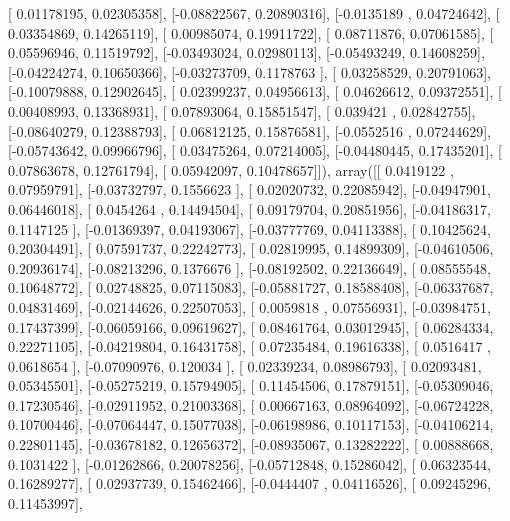 \documentclass{article}
\begin{document}
       [ 0.01178195,  0.02305358],
       [-0.08822567,  0.20890316],
       [-0.0135189 ,  0.04724642],
       [ 0.03354869,  0.14265119],
       [ 0.00985074,  0.19911722],
       [ 0.08711876,  0.07061585],
       [ 0.05596946,  0.11519792],
       [-0.03493024,  0.02980113],
       [-0.05493249,  0.14608259],
       [-0.04224274,  0.10650366],
       [-0.03273709,  0.1178763 ],
       [ 0.03258529,  0.20791063],
       [-0.10079888,  0.12902645],
       [ 0.02399237,  0.04956613],
       [ 0.04626612,  0.09372551],
       [ 0.00408993,  0.13368931],
       [ 0.07893064,  0.15851547],
       [ 0.039421  ,  0.02842755],
       [-0.08640279,  0.12388793],
       [ 0.06812125,  0.15876581],
       [-0.0552516 ,  0.07244629],
       [-0.05743642,  0.09966796],
       [ 0.03475264,  0.07214005],
       [-0.04480445,  0.17435201],
       [ 0.07863678,  0.12761794],
       [ 0.05942097,  0.10478657]]), array([[ 0.0419122 ,  0.07959791],
       [-0.03732797,  0.1556623 ],
       [ 0.02020732,  0.22085942],
       [-0.04947901,  0.06446018],
       [ 0.0454264 ,  0.14494504],
       [ 0.09179704,  0.20851956],
       [-0.04186317,  0.1147125 ],
       [-0.01369397,  0.04193067],
       [-0.03777769,  0.04113388],
       [ 0.10425624,  0.20304491],
       [ 0.07591737,  0.22242773],
       [ 0.02819995,  0.14899309],
       [-0.04610506,  0.20936174],
       [-0.08213296,  0.1376676 ],
       [-0.08192502,  0.22136649],
       [ 0.08555548,  0.10648772],
       [ 0.02748825,  0.07115083],
       [-0.05881727,  0.18588408],
       [-0.06337687,  0.04831469],
       [-0.02144626,  0.22507053],
       [ 0.0059818 ,  0.07556931],
       [-0.03984751,  0.17437399],
       [-0.06059166,  0.09619627],
       [ 0.08461764,  0.03012945],
       [ 0.06284334,  0.22271105],
       [-0.04219804,  0.16431758],
       [ 0.07235484,  0.19616338],
       [ 0.0516417 ,  0.0618654 ],
       [-0.07090976,  0.120034  ],
       [ 0.02339234,  0.08986793],
       [ 0.02093481,  0.05345501],
       [-0.05275219,  0.15794905],
       [ 0.11454506,  0.17879151],
       [-0.05309046,  0.17230546],
       [-0.02911952,  0.21003368],
       [ 0.00667163,  0.08964092],
       [-0.06724228,  0.10700446],
       [-0.07064447,  0.15077038],
       [-0.06198986,  0.10117153],
       [-0.04106214,  0.22801145],
       [-0.03678182,  0.12656372],
       [-0.08935067,  0.13282222],
       [ 0.00888668,  0.1031422 ],
       [-0.01262866,  0.20078256],
       [-0.05712848,  0.15286042],
       [ 0.06323544,  0.16289277],
       [ 0.02937739,  0.15462466],
       [-0.0444407 ,  0.04116526],
       [ 0.09245296,  0.11453997],
\end{document}
